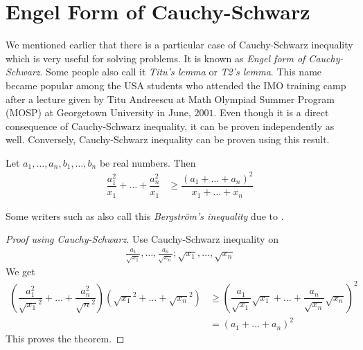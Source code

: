 \documentclass{subfile}
\begin{document}
	\section{Engel Form of Cauchy-Schwarz}\label{sec:engel}
	We mentioned earlier that there is a particular case of Cauchy-Schwarz inequality which is very useful for solving problems. It is known as \emph{Engel form of Cauchy-Schwarz}. Some people also call it \emph{Titu's lemma} or \emph{T2's lemma}. This name became popular among the USA students who attended the IMO training camp after a lecture given by Titu Andreescu at Math Olympiad Summer Program (MOSP) at Georgetown University in June, $2001$. Even though it is a direct consequence of Cauchy-Schwarz inequality, it can be proven independently as well. Conversely, Cauchy-Schwarz inequality can be proven using this result.
		\begin{theorem}\label{thm:engel}
			Let $a_1,\ldots,a_n,b_1,\ldots,b_n$ be real numbers. Then
				\begin{align}
					\dfrac{a_1^2}{x_1}+\ldots+\dfrac{a_n^2}{x_1}
						& \geq\dfrac{(a_1+\ldots+a_n)^2}{x_1+\ldots+x_n}\label{ineq:engel}
				\end{align}
		\end{theorem}
	Some writers such as \textcite{mitrinovitch_1959, bellman_1955} also call this \emph{Bergstr\"{o}m's inequality} due to \textcite{bergstrom_1949}. 
		\begin{proof}[Proof using Cauchy-Schwarz]
			Use Cauchy-Schwarz inequality on
				\begin{align*}
					\frac{a_1}{\sqrt{x_1}},\ldots,\frac{a_{n}}{\sqrt{x_{n}}};\sqrt{x_1},\ldots,\sqrt{x_n}
				\end{align*}
			We get
				\begin{align*}
					\left(\dfrac{a_1^2}{\sqrt{x_1}^2}+\ldots+\dfrac{a_n^2}{\sqrt{n}^2}\right)\left(\sqrt{x_1}^2+\ldots+\sqrt{x_n}^2\right)
						& \geq\left(\dfrac{a_1}{\sqrt{x_1}}\sqrt{x_1}+\ldots+\dfrac{a_n}{\sqrt{x_n}}\sqrt{x_n}\right)^2\\
						& = (a_1+\ldots+a_n)^2
				\end{align*}
			This proves the theorem.
		\end{proof}
	
\end{document}
